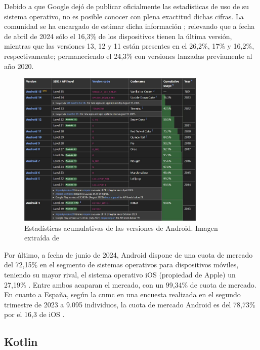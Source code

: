         Debido a que Google dejó de publicar oficialmente las estadísticas de uso de su sistema operativo, no es posible conocer con plena exactitud dichas cifras. La comunidad se ha encargado de estimar dicha información \cite{belinski_android_nodate}; relevando que a fecha de abril de 2024 sólo el 16,3\% de los dispositivos tienen la última versión, mientras que las versiones 13, 12 y 11 están presentes en el 26,2\%, 17\% y 16,2\%, respectivamente; permaneciendo el 24,3\% con versiones lanzadas previamente al año 2020.

        \begin{figure}[h]
            \centering
            \includegraphics[width=0.8\textwidth]{figures/Android usage.JPG}
            \caption[Estadísticas acumulativas de las versiones de Android]
            {Estadísticas acumulativas de las versiones de Android. Imagen extraída de \cite{belinski_android_nodate}}
            \label{figure:android:usage}
        \end{figure}

        Por último, a fecha de junio de 2024, Android dispone de una cuota de mercado del 72,15\% en el segmento de sistemas operativos para dispositivos móviles, teniendo su mayor rival, el sistema operativo iOS (propiedad de Apple) un 27,19\% \cite{melo_infografi_2024}. Entre ambos acaparan el mercado, con un 99,34\% de cuota de mercado. En cuanto a España, según la \gls{cnmc} en una encuesta realizada en el segundo trimestre de 2023 a 9.095 individuos, la cuota de mercado Android es del 78,73\% por el 16,3 de iOS \cite{comision_nacional_de_los_mercados_y_la_competencia_android_2023}.

    \subsection{Kotlin}

